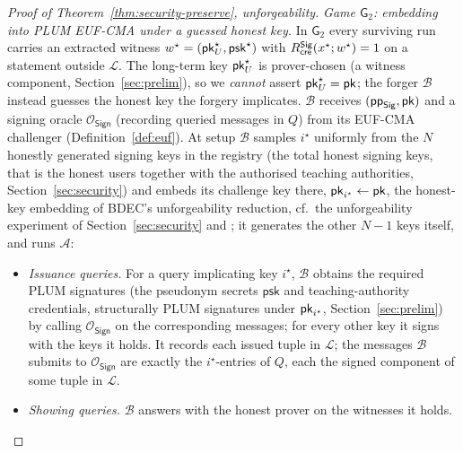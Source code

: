 \begin{proof}[Proof of Theorem~\ref{thm:security-preserve}, unforgeability]
    \smallskip\noindent\emph{Game $\mathsf G_2$: embedding into PLUM
EUF-CMA under a guessed honest key.} In $\mathsf G_2$ every surviving run carries an extracted witness $w^\star=(\mathsf{pk}_U^\star,\mathsf{psk}^\star)$ with $R^{\mathsf{Sig}}_{\mathsf{cre}}(x^\star;w^\star)=1$ on a statement outside $\mathcal L$. The long-term key $\mathsf{pk}_U^\star$ is prover-chosen (a witness component, Section~\ref{sec:prelim}), so we \emph{cannot} assert $\mathsf{pk}_U^\star=\mathsf{pk}$; the forger $\mathcal B$ instead guesses the honest key the forgery implicates. $\mathcal B$ receives $(\mathsf{pp}_{\mathsf{Sig}},\mathsf{pk})$ and a signing oracle $\mathcal O_{\mathsf{Sign}}$ (recording queried messages in $Q$) from its EUF-CMA challenger (Definition~\ref{def:euf}). At setup $\mathcal B$ samples $i^\star$ uniformly from the $N$ honestly generated signing keys in the registry (the total honest signing keys, that is the honest users together with the authorised teaching authorities, Section~\ref{sec:security}) and embeds its challenge key there, $\mathsf{pk}_{i^\star}\leftarrow\mathsf{pk}$, the honest-key embedding of BDEC's unforgeability reduction, cf.\ the unforgeability experiment of Section~\ref{sec:security} and \cite[Appendix~A.1]{10.1007/978-981-96-0957-4_3}; it generates the other $N-1$ keys itself, and runs $\mathcal A$:
    \begin{itemize}
      \item \emph{Issuance queries.} For a query implicating key $i^\star$,
      $\mathcal B$ obtains the required PLUM signatures (the pseudonym secrets
      $\mathsf{psk}$ and teaching-authority credentials, structurally PLUM
      signatures under $\mathsf{pk}_{i^\star}$, Section~\ref{sec:prelim}) by calling
      $\mathcal O_{\mathsf{Sign}}$ on the corresponding messages; for every other
      key it signs with the keys it holds. It records each issued tuple in
      $\mathcal L$; the messages $\mathcal B$ submits to $\mathcal O_{\mathsf{Sign}}$
      are exactly the $i^\star$-entries of $Q$, each the signed component of some
      tuple in $\mathcal L$.
      \item \emph{Showing queries.} $\mathcal B$ answers with the honest prover on
      the witnesses it holds.
    \end{itemize}

\end{proof}
